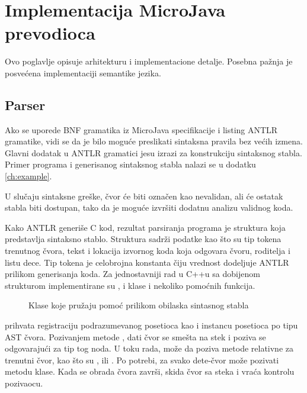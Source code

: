 \chapter{Implementacija MicroJava prevodioca}
\label{ch:implementacija}

Ovo poglavlje opisuje arhitekturu i implementacione detalje. Posebna pažnja je posvećena implementaciji semantike jezika.

\section{Parser}

Ako se uporede BNF gramatika iz MicroJava specifikacije i listing ANTLR gramatike, vidi se da je bilo moguće preslikati sintaksna pravila bez većih izmena.
Glavni dodatak u ANTLR gramatici jesu izrazi za konstrukciju sintaksnog stabla.
Primer programa i generisanog sintaksnog stabla nalazi se u dodatku \ref{ch:example}.

U slučaju sintaksne greške, čvor će biti označen kao nevalidan, ali će ostatak stabla biti dostupan, tako da je moguće izvršiti dodatnu analizu validnog koda.

Kako ANTLR generiše C kod, rezultat parsiranja programa je struktura  koja predstavlja sintaksno stablo.
Struktura sadrži podatke kao što su tip tokena trenutnog čvora, tekst i lokacija izvornog koda koja odgovara čvoru, roditelja i listu dece.
Tip tokena je celobrojna konstanta čiju vrednost dodeljuje ANTLR prilikom generisanja koda.
Za jednostavniji rad  u C++u sa dobijenom strukturom implementirane su
,  i  klase i nekoliko pomoćnih funkcija.

\begin{figure}[h]
	\centering
	
	\caption{Klase koje pružaju pomoć prilikom obilaska sintasnog stabla}
	\label{fig:visitor}
\end{figure}

 prihvata registraciju podrazumevanog posetioca kao i instancu posetioca po tipu AST čvora.
Pozivanjem metode , dati čvor se smešta na stek i poziva se odgovarajući  za tip tog noda.
U toku rada,  može da poziva metode relativne za trenutni čvor, kao što su ,  ili .
Po potrebi, za svako dete-čvor može pozivati  metodu  klase.
Kada se obrada čvora završi,  skida čvor sa steka i vraća kontrolu pozivaocu.

